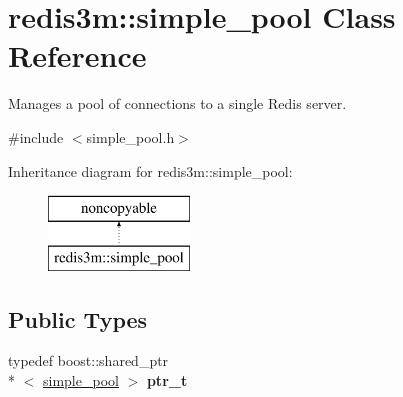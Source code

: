 \hypertarget{classredis3m_1_1simple__pool}{\section{redis3m\-:\-:simple\-\_\-pool Class Reference}
\label{classredis3m_1_1simple__pool}
}


Manages a pool of connections to a single Redis server.  




{\ttfamily \#include $<$simple\-\_\-pool.\-h$>$}

Inheritance diagram for redis3m\-:\-:simple\-\_\-pool\-:\begin{figure}[H]
\begin{center}
\leavevmode
\includegraphics[height=2.000000cm]{classredis3m_1_1simple__pool}
\end{center}
\end{figure}
\subsection*{Public Types}
\begin{DoxyCompactItemize}
\item 
\hypertarget{classredis3m_1_1simple__pool_ab31a00132975f0a60479a1f8f6ad53de}{typedef boost\-::shared\-\_\-ptr\\*
$<$ \hyperlink{classredis3m_1_1simple__pool}{simple\-\_\-pool} $>$ {\bfseries ptr\-\_\-t}}\label{classredis3m_1_1simple__pool_ab31a00132975f0a60479a1f8f6ad53de}

\end{DoxyCompactItemize}
